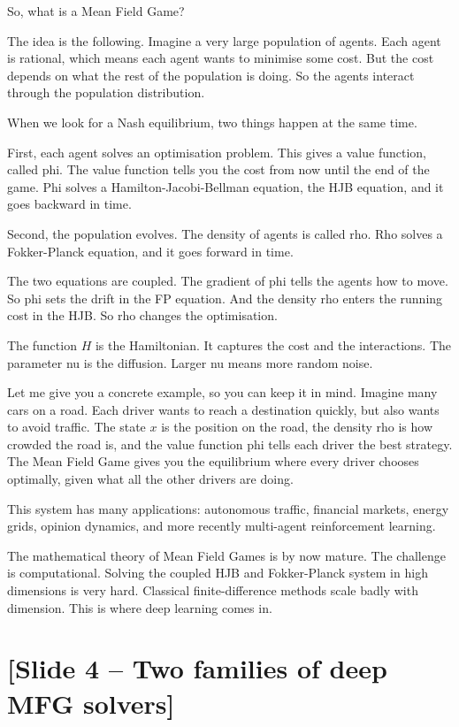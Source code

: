 \documentclass[11pt]{article}
\begin{document}
So, what is a Mean Field Game?

The idea is the following. Imagine a very large population of agents. Each
agent is rational, which means each agent wants to minimise some cost. But
the cost depends on what the rest of the population is doing. So the agents
interact through the population distribution.

When we look for a Nash equilibrium, two things happen at the same time.

First, each agent solves an optimisation problem. This gives a value function,
called phi. The value function tells you the cost from now until the end of
the game. Phi solves a Hamilton-Jacobi-Bellman equation, the HJB equation,
and it goes backward in time.

Second, the population evolves. The density of agents is called rho. Rho
solves a Fokker-Planck equation, and it goes forward in time.

The two equations are coupled. The gradient of phi tells the agents how to
move. So phi sets the drift in the FP equation. And the density rho enters
the running cost in the HJB. So rho changes the optimisation.

The function $H$ is the Hamiltonian. It captures the cost and the interactions.
The parameter nu is the diffusion. Larger nu means more random noise.

Let me give you a concrete example, so you can keep it in mind. Imagine
many cars on a road. Each driver wants to reach a destination quickly, but
also wants to avoid traffic. The state $x$ is the position on the road,
the density rho is how crowded the road is, and the value function phi
tells each driver the best strategy. The Mean Field Game gives you the
equilibrium where every driver chooses optimally, given what all the other
drivers are doing.

This system has many applications: autonomous traffic, financial markets,
energy grids, opinion dynamics, and more recently multi-agent reinforcement
learning.

The mathematical theory of Mean Field Games is by now mature. The challenge
is computational. Solving the coupled HJB and Fokker-Planck system in high
dimensions is very hard. Classical finite-difference methods scale badly
with dimension. This is where deep learning comes in.

\section*{[Slide 4 -- Two families of deep MFG solvers]}
\end{document}
